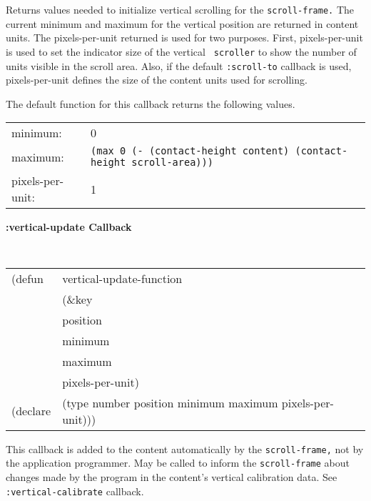 \begin{flushright} \parbox[t]{6.125in}{ 
Returns values needed to initialize
vertical scrolling for the {\tt scroll-frame.}  The current minimum and
maximum for the vertical position are returned in content units.
The pixels-per-unit returned is used for two purposes. First, pixels-per-unit
is used to set the indicator size of the vertical {\tt
scroller} to show the number of units visible in the scroll area. Also, 
if the default {\tt :scroll-to} callback is used, pixels-per-unit defines the
size of the content units used for scrolling.  

The default function for this callback returns the following values.
\begin{center}
\begin{tabular}[t]{ll}
minimum: &	0 \\ 
maximum: &	{\tt (max 0 (- (contact-height content) (contact-height scroll-area)))}\\ 
pixels-per-unit: & 1\\
\end{tabular}
\end{center}
}\end{flushright}


			
{\samepage
{\large {\bf :vertical-update \hfill Callback}} 
\begin{flushright} 
\parbox[t]{6.125in}{
\tt
\begin{tabular}{lll}
\raggedright
(defun & vertical-update-function & \\  
& (\&key \\
&  position \\
&  minimum \\
&  maximum \\
&  pixels-per-unit) \\
(declare &(type  number  position minimum maximum pixels-per-unit)))
\end{tabular}
\rm
}\end{flushright}}

\begin{flushright} \parbox[t]{6.125in}{ 
This callback is added to the content
automatically by the {\tt scroll-frame,} not by the application programmer.  May
be called to inform the {\tt scroll-frame} about changes made by the program in
the content's vertical calibration data. See {\tt :vertical-calibrate} callback.

}\end{flushright}



